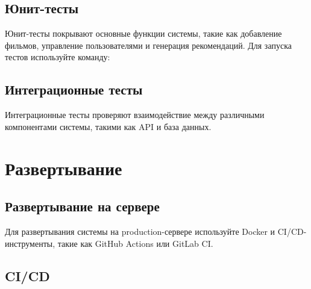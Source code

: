 \hypertarget{ux44eux43dux438ux442-ux442ux435ux441ux442ux44b}{%
\subsection*{Юнит-тесты}\label{ux44eux43dux438ux442-ux442ux435ux441ux442ux44b}}

Юнит-тесты покрывают основные функции системы, такие как добавление
фильмов, управление пользователями и генерация рекомендаций. Для запуска
тестов используйте команду:

\begin{Shaded}
\begin{Highlighting}[]
\end{Highlighting}
\end{Shaded}

\hypertarget{ux438ux43dux442ux435ux433ux440ux430ux446ux438ux43eux43dux43dux44bux435-ux442ux435ux441ux442ux44b}{%
\subsection*{Интеграционные
тесты}\label{ux438ux43dux442ux435ux433ux440ux430ux446ux438ux43eux43dux43dux44bux435-ux442ux435ux441ux442ux44b}}

Интеграционные тесты проверяют взаимодействие между различными
компонентами системы, такими как API и база данных.

\hypertarget{ux440ux430ux437ux432ux435ux440ux442ux44bux432ux430ux43dux438ux435}{%
\section{Развертывание}\label{ux440ux430ux437ux432ux435ux440ux442ux44bux432ux430ux43dux438ux435}}

\hypertarget{ux440ux430ux437ux432ux435ux440ux442ux44bux432ux430ux43dux438ux435-ux43dux430-ux441ux435ux440ux432ux435ux440ux435}{%
\subsection*{Развертывание на
сервере}\label{ux440ux430ux437ux432ux435ux440ux442ux44bux432ux430ux43dux438ux435-ux43dux430-ux441ux435ux440ux432ux435ux440ux435}}

Для развертывания системы на production-сервере используйте Docker и
CI/CD-инструменты, такие как GitHub Actions или GitLab CI.

\hypertarget{cicd}{%
\subsection*{CI/CD}\label{cicd}}


